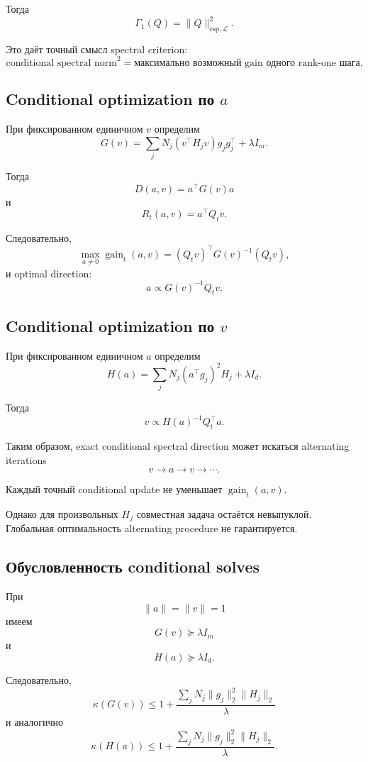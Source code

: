 Тогда
\[
\boxed{
    \Gamma_1(Q)
    =
    \|Q\|_{\mathrm{csp},\mathcal L}^2.
}
\]

Это даёт точный смысл spectral criterion:
\[
\boxed{
    \text{conditional spectral norm}^2
    =
    \text{максимально возможный gain одного rank-one шага}.
}
\]

\subsection{Conditional optimization по $a$}

При фиксированном единичном $v$ определим
\[
\boxed{
    G(v)
    =
    \sum_j
    N_j
    (v^\top H_jv)
    g_jg_j^\top
    +
    \lambda I_m.
}
\]

Тогда
\[
    D(a,v)
    =
    a^\top G(v)a
\]
и
\[
    R_t(a,v)
    =
    a^\top Q_tv.
\]

Следовательно,
\[
\boxed{
    \max_{a\neq0}
    \operatorname{gain}_t(a,v)
    =
    (Q_tv)^\top
    G(v)^{-1}
    (Q_tv),
}
\]
и optimal direction:
\[
\boxed{
    a
    \propto
    G(v)^{-1}Q_tv.
}
\]

\subsection{Conditional optimization по $v$}

При фиксированном единичном $a$ определим
\[
\boxed{
    H(a)
    =
    \sum_j
    N_j
    (a^\top g_j)^2H_j
    +
    \lambda I_d.
}
\]

Тогда
\[
\boxed{
    v
    \propto
    H(a)^{-1}Q_t^\top a.
}
\]

Таким образом, exact conditional spectral direction может
искаться alternating iterations
\[
\boxed{
    v
    \rightarrow
    a
    \rightarrow
    v
    \rightarrow
    \cdots.
}
\]

Каждый точный conditional update не уменьшает
$\operatorname{gain}_t(a,v)$.

Однако для произвольных $H_j$ совместная задача остаётся невыпуклой.
Глобальная оптимальность alternating procedure не гарантируется.

\subsection{Обусловленность conditional solves}

При
\[
    \|a\|=\|v\|=1
\]
имеем
\[
    G(v)\succeq\lambda I_m
\]
и
\[
    H(a)\succeq\lambda I_d.
\]

Следовательно,
\[
\boxed{
    \kappa(G(v))
    \le
    1+
    \frac{
        \sum_j
        N_j
        \|g_j\|_2^2
        \|H_j\|_2
    }{
        \lambda
    }
}
\]
и аналогично
\[
\boxed{
    \kappa(H(a))
    \le
    1+
    \frac{
        \sum_j
        N_j
        \|g_j\|_2^2
        \|H_j\|_2
    }{
        \lambda
    }.
}
\]

